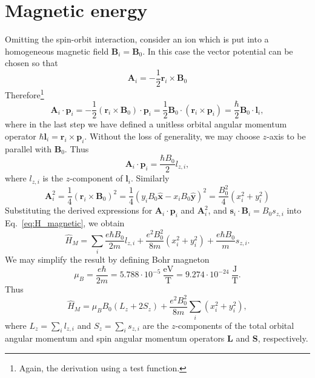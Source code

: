 \section{Magnetic energy}
Omitting the spin-orbit interaction, consider an ion which is put into a homogeneous magnetic field $\mathbf{B}_i = \mathbf{B}_0$. In this case the vector potential can be chosen so that 
\begin{equation}
\mathbf{A}_i = -\frac{1}{2}\mathbf{r}_i \times \mathbf{B}_0
\end{equation}
Therefore\footnote{Again, the derivation using a test function.}
\begin{equation}
\mathbf{A}_i\cdot\mathbf{p}_i = 
-\frac{1}{2} \left(\mathbf{r}_i\times\mathbf{B}_0\right)\cdot \mathbf{p}_i
= \frac{1}{2} \mathbf{B}_0 \cdot  \left(\mathbf{r}_i\times\mathbf{p}_i\right)
= \frac{\hbar}{2} \mathbf{B}_0 \cdot  \mathbf{l}_i, 
\end{equation}
where in the last step we have defined a unitless orbital angular momentum operator $\hbar \mathbf{l}_i = \mathbf{r}_i\times\mathbf{p}_i$. Without the loss of generality, we may choose $z$-axis to be parallel with $\mathbf{B}_0$. Thus
\begin{equation}
\mathbf{A}_i\cdot\mathbf{p}_i = \frac{\hbar B_0}{2} l_{z,i},
\end{equation}
where $l_{z,i}$ is the $z$-component of $\mathbf{l}_i$. Similarly
\begin{equation}
\mathbf{A}_i^2 = \frac{1}{4} (\mathbf{r}_i \times \mathbf{B}_0)^2 =
\frac{1}{4} (y_iB_0\hat{\mathbf{x}} - x_iB_0\hat{\mathbf{y}} )^2 = \frac{B_0^2}{4}(x_i^2+y_i^2)
\end{equation}
Substituting the derived expressions for $\mathbf{A}_i\cdot\mathbf{p}_i$ and $\mathbf{A}_i^2$, and $\mathbf{s}_i\cdot\mathbf{B}_i = B_0 s_{z,i}$ into Eq.~\eqref{eq:H_magnetic}, we obtain
\begin{equation}
\hat{H}_M = \sum_i \frac{e \hbar B_0}{2m}l_{z,i} + \frac{e^2 B_0^2}{8 m} (x_i^2 + y_i^2) + 
\frac{e \hbar B_0}{m} s_{z,i}.
\end{equation}
We may simplify the result by defining Bohr magneton 
\begin{equation}
\mu_B = \frac{e \hbar}{2 m} = 5.788 \cdot 10^{-5}\ \frac{\mathrm{eV}}{\mathrm{T}} 
= 9.274 \cdot 10^{-24}\ \frac{\mathrm{J}}{\mathrm{T}} .
\end{equation}
Thus
\begin{equation}
\hat{H}_M = \mu_B B_0 (L_z + 2 S_z) + \frac{e^2 B_0^2}{8 m} \sum_i (x_i^2 + y_i^2),
\end{equation}
where $L_z = \sum_i l_{z,i}$ and $S_z = \sum_i s_{z,i}$ are the $z$-components of the total orbital angular momentum and spin angular momentum operators $\mathbf{L}$ and $\mathbf{S}$, respectively.


